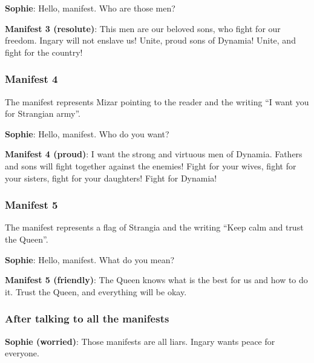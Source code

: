 \textbf{Sophie}: Hello, manifest. Who are those men?

\textbf{Manifest 3 (resolute)}: This men are our beloved sons, who fight for our freedom. Ingary will not enslave us! Unite, proud sons of Dynamia! Unite, and fight for the country!

\subsubsection*{Manifest 4}
The manifest represents Mizar pointing to the reader and the writing \enquote{I want you for Strangian army}.

\textbf{Sophie}: Hello, manifest. Who do you want?

\textbf{Manifest 4 (proud)}: I want the strong and virtuous men of Dynamia. Fathers and sons will fight together against the enemies! Fight for your wives, fight for your sisters, fight for your daughters! Fight for Dynamia!

%
%

\subsubsection*{Manifest 5}
The manifest represents a flag of Strangia and the writing \enquote{Keep calm and trust the Queen}.

\textbf{Sophie}: Hello, manifest. What do you mean?

\textbf{Manifest 5 (friendly)}: The Queen knows what is the best for us and how to do it. Trust the Queen, and everything will be okay.

%
%

\subsubsection*{After talking to all the manifests}
\textbf{Sophie (worried)}: Those manifests are all liars. Ingary wants peace for everyone.

